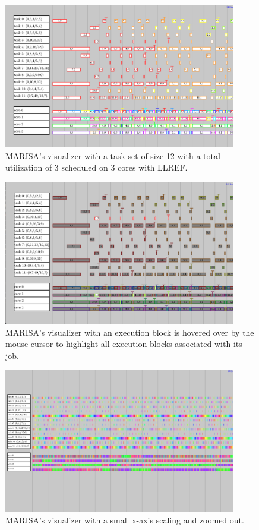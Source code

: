 \documentclass[conference,compsoc]{IEEEtran}
\begin{document}
\begin{figure}
\includegraphics[width=4in]{MARISA_standard.png}
\caption{MARISA's visualizer with a task set of size 12 with a total utilization of 3 scheduled on 3 cores with LLREF.}
\label{fig_marisa_standard}
\end{figure}
\begin{figure}
\includegraphics[width=4in]{MARISA_hover.png}
\caption{MARISA's visualizer with an execution block is hovered over by the mouse cursor to highlight all execution blocks associated with its job.}
\label{fig_marisa_hover}
\end{figure}
\begin{figure}
\includegraphics[width=4in]{MARISA_squished.png}
\caption{MARISA's visualizer with a small x-axis scaling and zoomed out.}
\label{fig_marisa_squished}
\end{figure}
\end{document}
